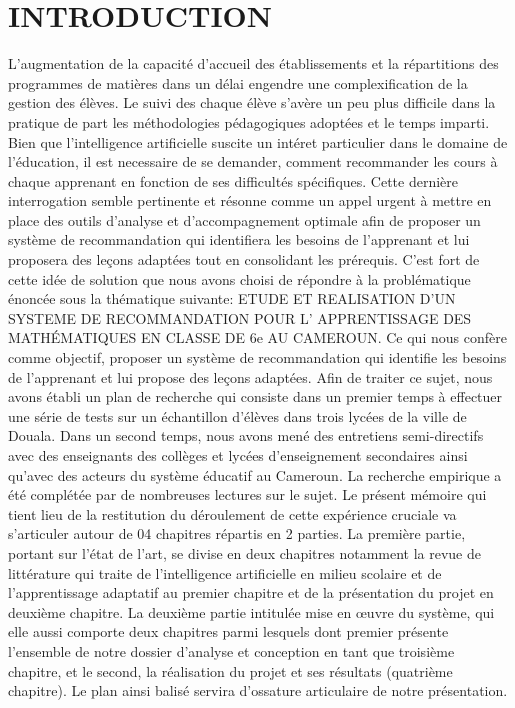 \chapter*{INTRODUCTION}

	L’augmentation de la capacité d’accueil des établissements et la répartitions des programmes de matières dans un délai engendre une complexification de la gestion des élèves. 
  Le suivi des chaque élève s’avère un peu plus difficile dans la pratique de part les méthodologies pédagogiques adoptées et le temps imparti. 
  Bien que l’intelligence artificielle suscite un intéret particulier dans le domaine de l’éducation, il est necessaire de se demander, 
  comment recommander les cours à chaque apprenant en fonction de ses difficultés spécifiques. Cette dernière interrogation semble pertinente 
  et résonne comme un appel urgent à mettre en place des outils d’analyse et d’accompagnement optimale afin de proposer un système de 
  recommandation qui identifiera les besoins de l’apprenant et lui proposera des leçons adaptées tout en consolidant les prérequis. 
  C’est fort de cette idée de solution que nous avons choisi de répondre à la problématique énoncée sous la thématique suivante: 
  ETUDE ET REALISATION D’UN SYSTEME DE RECOMMANDATION POUR L’ APPRENTISSAGE DES MATHÉMATIQUES EN CLASSE DE 6e AU CAMEROUN. 
  Ce qui nous confère comme objectif, proposer un système de recommandation qui identifie les besoins de l’apprenant et lui propose des leçons adaptées. 
  Afin de traiter ce sujet, nous avons établi un plan de recherche qui consiste dans un premier temps à effectuer une série de tests sur un échantillon d’élèves 
  dans trois lycées de la ville de Douala. Dans un second temps, nous avons mené des entretiens semi-directifs avec des enseignants des collèges et lycées 
  d’enseignement secondaires ainsi qu’avec des acteurs du système éducatif au Cameroun. La recherche empirique a été complétée par de nombreuses lectures sur le sujet.
Le présent mémoire qui tient lieu de la restitution du déroulement de cette expérience cruciale va s’articuler autour de 04 chapitres répartis en 2 parties. 
La première partie, portant sur l’état de l’art, se divise en deux chapitres notamment la revue de littérature qui traite de l’intelligence artificielle en milieu 
scolaire et de l’apprentissage adaptatif  au premier chapitre et de la présentation du projet en deuxième chapitre. 
La deuxième partie intitulée mise en œuvre du système, qui elle aussi comporte deux chapitres parmi lesquels dont premier présente l’ensemble de notre 
dossier d’analyse et conception en tant que troisième chapitre, et le second, la réalisation du projet et ses résultats (quatrième chapitre). 
Le plan ainsi balisé servira d’ossature articulaire de notre présentation. 
